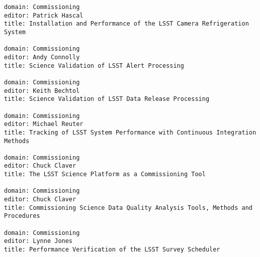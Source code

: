 \begin{verbatim}
domain: Commissioning 
editor: Patrick Hascal 
title: Installation and Performance of the LSST Camera Refrigeration System

domain: Commissioning 
editor: Andy Connolly 
title: Science Validation of LSST Alert Processing

domain: Commissioning 
editor: Keith Bechtol 
title: Science Validation of LSST Data Release Processing 

domain: Commissioning 
editor: Michael Reuter 
title: Tracking of LSST System Performance with Continuous Integration Methods 

domain: Commissioning 
editor: Chuck Claver 
title: The LSST Science Platform as a Commissioning Tool 

domain: Commissioning 
editor: Chuck Claver 
title: Commissioning Science Data Quality Analysis Tools, Methods and Procedures

domain: Commissioning 
editor: Lynne Jones 
title: Performance Verification of the LSST Survey Scheduler 


\end{verbatim}